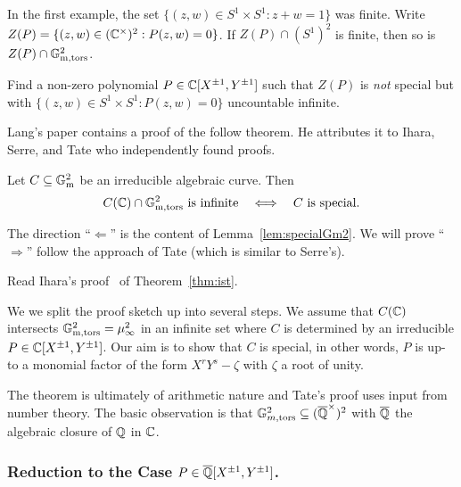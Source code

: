 In the first example, the set $\{(z,w) \in S^1\times S^1 : z+w=1\}$
was finite. Write $Z(P) = \{(z,w) \in ({\mathbb{C}}^\times)^2 : P(z,w)=0\}$. If
$Z(P)\cap (S^1)^2$ is finite, then so is $Z(P) \cap {\mathbb{G}}^2_{{\mathrm{m}},\mathrm{tors}}$.

\begin{exercise}
  \label{exer:toralpoly}
  Find a non-zero polynomial $P\in {\mathbb{C}}[X^{\pm 1},Y^{\pm 1}]$ such that
  $Z(P)$ is \emph{not} special but with $\{(z,w)\in S^1 \times S^1 :
  P(z,w)=0\}$ uncountable infinite.  
\end{exercise}

Lang's paper contains a proof of the follow theorem. He
attributes it to Ihara, Serre, and Tate who independently found
proofs. 

\begin{theorem}
  \label{thm:ist}
  Let $C\subseteq {\mathbb{G}}_{\mathrm{m}}^2$ be an irreducible algebraic curve.
  Then
  \begin{equation*}
    C({\mathbb{C}}) \cap {\mathbb{G}}^2_{{\mathrm{m}},\mathrm{tors}}\text{ is infinite}\quad\Longleftrightarrow\quad \text{$C$ is special}. 
  \end{equation*}
\end{theorem}

The direction ``$\Longleftarrow$'' is the content of
Lemma~\ref{lem:specialGm2}. 
 We will prove ``$\Longrightarrow$'' follow
the approach of Tate (which is similar to Serre's).

\begin{exercise}
  Read Ihara's proof~\cite{Lang:Division} of Theorem~\ref{thm:ist}.
\end{exercise}

We we split the proof sketch up into several steps. We assume that
$C({\mathbb{C}})$ intersects ${\mathbb{G}}^2_{{\mathrm{m}},\mathrm{tors}}=\mu_\infty^2$
in an infinite set where $C$ is determined by an irreducible $P\in
{\mathbb{C}}[X^{\pm 1},Y^{\pm 1}]$.
Our aim is to show that $C$ is special, in other words, $P$ is up-to a
monomial factor of the form $X^rY^s-\zeta$ with $\zeta$ a root of
unity. 

The theorem is ultimately of arithmetic nature and Tate's proof uses
input from number theory. The basic observation is that
$\mathbb{G}^2_{m,\mathrm{tors}}\subseteq
({\overline{\mathbb{Q}}}^\times)^2$ with ${\overline{\mathbb{Q}}}$ the algebraic closure
of ${\mathbb{Q}}$ in ${\mathbb{C}}$.

\subsubsection{Reduction to the Case $P \in {\overline{\mathbb{Q}}}[X^{\pm
    1},Y^{\pm 1}]$.}

